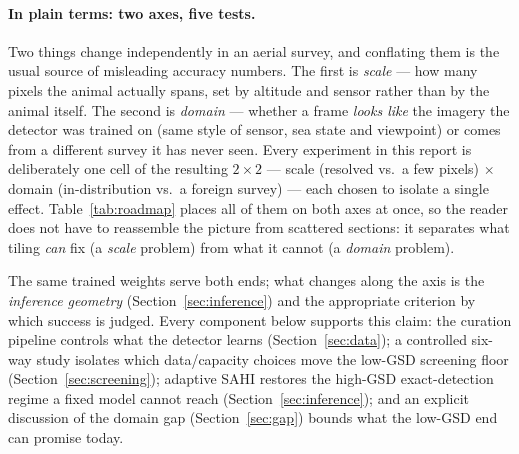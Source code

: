 \documentclass[11pt,a4paper]{article}
\begin{document}
\paragraph{In plain terms: two axes, five tests.} Two things change
independently in an aerial survey, and conflating them is the usual source of
misleading accuracy numbers. The first is \emph{scale} --- how many pixels the
animal actually spans, set by altitude and sensor rather than by the animal
itself. The second is \emph{domain} --- whether a frame \emph{looks like} the
imagery the detector was trained on (same style of sensor, sea state and
viewpoint) or comes from a different survey it has never seen. Every experiment
in this report is deliberately one cell of the resulting $2\times2$ ---
scale (resolved vs.\ a few pixels) $\times$ domain (in-distribution vs.\ a
foreign survey) --- each chosen to isolate a single effect. Table~\ref{tab:roadmap}
places all of them on both axes at once, so the reader does not have to reassemble
the picture from scattered sections: it separates what tiling \emph{can} fix (a
\emph{scale} problem) from what it cannot (a \emph{domain} problem).

The same trained weights serve both ends; what changes along the axis is the
\emph{inference geometry} (Section~\ref{sec:inference}) and the appropriate criterion
by which success is judged. Every component below supports this claim: the
curation pipeline controls what the detector learns
(Section~\ref{sec:data}); a controlled six-way study isolates which
data/capacity choices move the low-GSD screening floor
(Section~\ref{sec:screening}); adaptive SAHI restores the high-GSD exact-detection
regime a fixed model cannot reach (Section~\ref{sec:inference}); and an explicit
discussion of the domain gap (Section~\ref{sec:gap}) bounds what the low-GSD end
can promise today.
\end{document}
